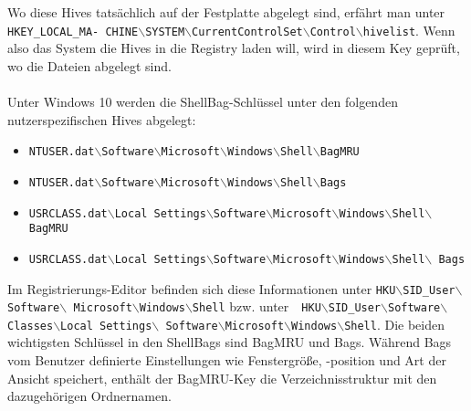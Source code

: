 Wo diese Hives tatsächlich auf der Festplatte abgelegt sind, erfährt man unter \texttt{HKEY\_LOCAL\_MA- \newline CHINE$\backslash$SYSTEM$\backslash$CurrentControlSet$\backslash$Control$\backslash$hivelist}. Wenn also das System die Hives in die Registry laden will, wird in diesem Key geprüft, wo die Dateien abgelegt sind. \cite[S.225]{anson2012mastering} \\
\\
Unter Windows 10 werden die ShellBag-Schlüssel unter den folgenden nutzerspezifischen Hives abgelegt: 
\begin{itemize}
	\item \texttt{NTUSER.dat$\backslash$Software$\backslash$Microsoft$\backslash$Windows$\backslash$Shell$\backslash$BagMRU}
	\item \texttt{NTUSER.dat$\backslash$Software$\backslash$Microsoft$\backslash$Windows$\backslash$Shell$\backslash$Bags}
	\item \texttt{USRCLASS.dat$\backslash$Local Settings$\backslash$Software$\backslash$Microsoft$\backslash$Windows$\backslash$Shell$\backslash$ \newline BagMRU}
	\item \texttt{USRCLASS.dat$\backslash$Local Settings$\backslash$Software$\backslash$Microsoft$\backslash$Windows$\backslash$Shell$\backslash$ \newline Bags} \cite[S.26]{kavrestad2018fundamentals}
\end{itemize}
Im Registrierungs-Editor befinden sich diese Informationen unter \texttt{HKU$\backslash$SID\_User$\backslash$Software$\backslash$ \newline Microsoft$\backslash$Windows$\backslash$Shell} bzw. unter\ \  \texttt{HKU$\backslash$SID\_User$\backslash$Software$\backslash$Classes$\backslash$Local Settings$\backslash$ \newline Software$\backslash$Microsoft$\backslash$Windows$\backslash$Shell}. \newline
Die beiden wichtigsten Schlüssel in den ShellBags sind \glqq BagMRU\grqq{} und \glqq Bags\grqq{}. Während \glqq Bags\grqq{} vom Benutzer definierte Einstellungen wie Fenstergröße, -position und Art der Ansicht speichert, enthält der \glqq BagMRU\grqq{}-Key die Verzeichnisstruktur mit den dazugehörigen Ordnernamen. \cite{lo2014windows} 

